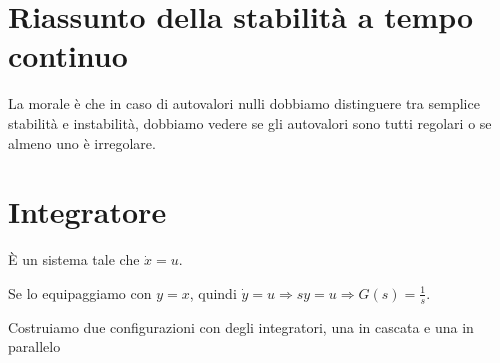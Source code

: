 \documentclass[10pt,a4paper]{book}
\begin{document}
\section{Riassunto della stabilità a tempo continuo}



La morale è che in caso di autovalori nulli dobbiamo distinguere tra semplice stabilità e instabilità, dobbiamo vedere se gli autovalori sono tutti regolari o se almeno uno è irregolare.
\section{Integratore}

È un sistema tale che $\dot{x} =u$.

Se lo equipaggiamo con $y=x$, quindi $\dot{y} =u\Rightarrow sy=u\Rightarrow \boxed{G\left( s\right) =\frac{1}{s}}$.

Costruiamo due configurazioni con degli integratori, una in cascata e una in parallelo
\end{document}
